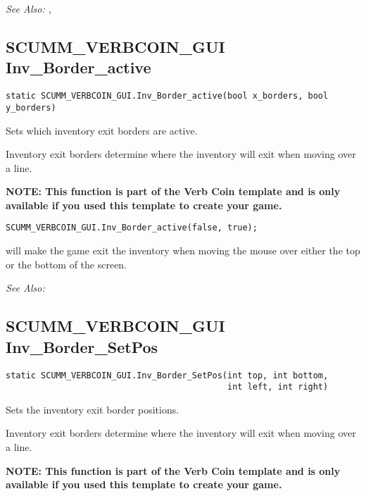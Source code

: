\it{See Also:} ,


\subsection{SCUMM_VERBCOIN_GUI Inv_Border_active}\label{SCUMM_VERBCOIN_GUI.Inv_Border_active}%

\begin{verbatim}
static SCUMM_VERBCOIN_GUI.Inv_Border_active(bool x_borders, bool y_borders)
\end{verbatim}
Sets which inventory exit borders are active.

Inventory exit borders determine where the inventory will exit when moving over a line.

\bf{NOTE:} This function is part of the Verb Coin template and is only available if
you used this template to create your game.

\begin{verbatim}
SCUMM_VERBCOIN_GUI.Inv_Border_active(false, true);
\end{verbatim}

will make the game exit the inventory when moving the mouse over either the top or the bottom of the screen.

\it{See Also:} 


\subsection{SCUMM_VERBCOIN_GUI Inv_Border_SetPos}\label{SCUMM_VERBCOIN_GUI.Inv_Border_SetPos}%

\begin{verbatim}
static SCUMM_VERBCOIN_GUI.Inv_Border_SetPos(int top, int bottom,
                                            int left, int right)
\end{verbatim}
Sets the inventory exit border positions.

Inventory exit borders determine where the inventory will exit when moving over a line.

\bf{NOTE:} This function is part of the Verb Coin template and is only available if
you used this template to create your game.

